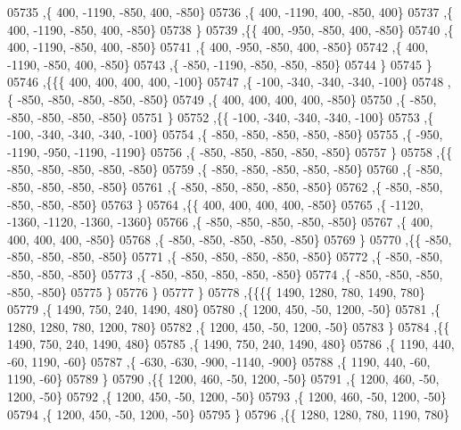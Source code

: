 \begin{DoxyCode}
05735     ,\{   400, -1190,  -850,   400,  -850\}
05736     ,\{   400, -1190,   400,  -850,   400\}
05737     ,\{   400, -1190,  -850,   400,  -850\}
05738     \}
05739    ,\{\{   400,  -950,  -850,   400,  -850\}
05740     ,\{   400, -1190,  -850,   400,  -850\}
05741     ,\{   400,  -950,  -850,   400,  -850\}
05742     ,\{   400, -1190,  -850,   400,  -850\}
05743     ,\{  -850, -1190,  -850,  -850,  -850\}
05744     \}
05745    \}
05746   ,\{\{\{   400,   400,   400,   400,  -100\}
05747     ,\{  -100,  -340,  -340,  -340,  -100\}
05748     ,\{  -850,  -850,  -850,  -850,  -850\}
05749     ,\{   400,   400,   400,   400,  -850\}
05750     ,\{  -850,  -850,  -850,  -850,  -850\}
05751     \}
05752    ,\{\{  -100,  -340,  -340,  -340,  -100\}
05753     ,\{  -100,  -340,  -340,  -340,  -100\}
05754     ,\{  -850,  -850,  -850,  -850,  -850\}
05755     ,\{  -950, -1190,  -950, -1190, -1190\}
05756     ,\{  -850,  -850,  -850,  -850,  -850\}
05757     \}
05758    ,\{\{  -850,  -850,  -850,  -850,  -850\}
05759     ,\{  -850,  -850,  -850,  -850,  -850\}
05760     ,\{  -850,  -850,  -850,  -850,  -850\}
05761     ,\{  -850,  -850,  -850,  -850,  -850\}
05762     ,\{  -850,  -850,  -850,  -850,  -850\}
05763     \}
05764    ,\{\{   400,   400,   400,   400,  -850\}
05765     ,\{ -1120, -1360, -1120, -1360, -1360\}
05766     ,\{  -850,  -850,  -850,  -850,  -850\}
05767     ,\{   400,   400,   400,   400,  -850\}
05768     ,\{  -850,  -850,  -850,  -850,  -850\}
05769     \}
05770    ,\{\{  -850,  -850,  -850,  -850,  -850\}
05771     ,\{  -850,  -850,  -850,  -850,  -850\}
05772     ,\{  -850,  -850,  -850,  -850,  -850\}
05773     ,\{  -850,  -850,  -850,  -850,  -850\}
05774     ,\{  -850,  -850,  -850,  -850,  -850\}
05775     \}
05776    \}
05777   \}
05778  ,\{\{\{\{  1490,  1280,   780,  1490,   780\}
05779     ,\{  1490,   750,   240,  1490,   480\}
05780     ,\{  1200,   450,   -50,  1200,   -50\}
05781     ,\{  1280,  1280,   780,  1200,   780\}
05782     ,\{  1200,   450,   -50,  1200,   -50\}
05783     \}
05784    ,\{\{  1490,   750,   240,  1490,   480\}
05785     ,\{  1490,   750,   240,  1490,   480\}
05786     ,\{  1190,   440,   -60,  1190,   -60\}
05787     ,\{  -630,  -630,  -900, -1140,  -900\}
05788     ,\{  1190,   440,   -60,  1190,   -60\}
05789     \}
05790    ,\{\{  1200,   460,   -50,  1200,   -50\}
05791     ,\{  1200,   460,   -50,  1200,   -50\}
05792     ,\{  1200,   450,   -50,  1200,   -50\}
05793     ,\{  1200,   460,   -50,  1200,   -50\}
05794     ,\{  1200,   450,   -50,  1200,   -50\}
05795     \}
05796    ,\{\{  1280,  1280,   780,  1190,   780\}

\end{DoxyCode}
